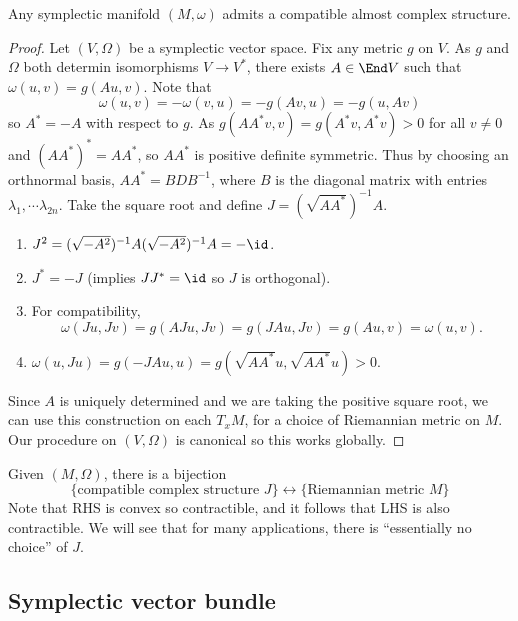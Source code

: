 \documentclass[a4paper]{article}
\begin{document}
\begin{proposition}
  Any symplectic manifold \((M, \omega)\) admits a compatible almost complex structure.
\end{proposition}

\begin{proof}
  Let \((V, \Omega)\) be a symplectic vector space. Fix any metric \(g\) on \(V\). As \(g\) and \(\Omega\) both determin isomorphisms \(V \to V^*\), there exists \(A \in \End V\) such that \(\omega(u, v) = g(Au, v)\). Note that
  \[
    \omega(u, v) = -\omega(v, u) = -g(Av, u) = -g(u, Av)
  \]
  so \(A^* = -A\) with respect to \(g\). As \(g(AA^*v, v) = g(A^*v, A^*v) > 0\) for all \(v \ne 0\) and \((AA^*)^* = AA^*\), so \(AA^*\) is positive definite symmetric. Thus by choosing an orthnormal basis, \(AA^* = BDB^{-1}\), where \(B\) is the diagonal matrix with entries \(\lambda_1, \cdots \lambda_{2n}\). Take the square root and define \(J = (\sqrt{AA^*})^{-1}A\).
  \begin{enumerate}
  \item \(J^2 = (\sqrt{-A^2})^{-1}A(\sqrt{-A^2})^{-1}A = -\id\).
  \item \(J^* = -J\) (implies \(JJ^* = \id\) so \(J\) is orthogonal).
  \item For compatibility,
    \[
      \omega(Ju, Jv) = g(AJu, Jv) = g(JAu, Jv) = g(Au, v) = \omega(u, v).
    \]
  \item \(\omega(u, Ju) = g(-JAu, u) = g(\sqrt{AA^*} u, \sqrt{AA^*} u) > 0\).
  \end{enumerate}

  Since \(A\) is uniquely determined and we are taking the positive square root, we can use this construction on each \(T_xM\), for a choice of Riemannian metric on \(M\). Our procedure on \((V, \Omega)\) is canonical so this works globally.
\end{proof}

\begin{note}
  Given \((M, \Omega)\), there is a bijection
  \[
    \{\text{compatible complex structure } J\} \longleftrightarrow \{\text{Riemannian metric } M\}
  \]
  Note that RHS is convex so contractible, and it follows that LHS is also contractible. We will see that for many applications, there is ``essentially no choice'' of \(J\).
\end{note}

\subsection{Symplectic vector bundle}
\end{document}
